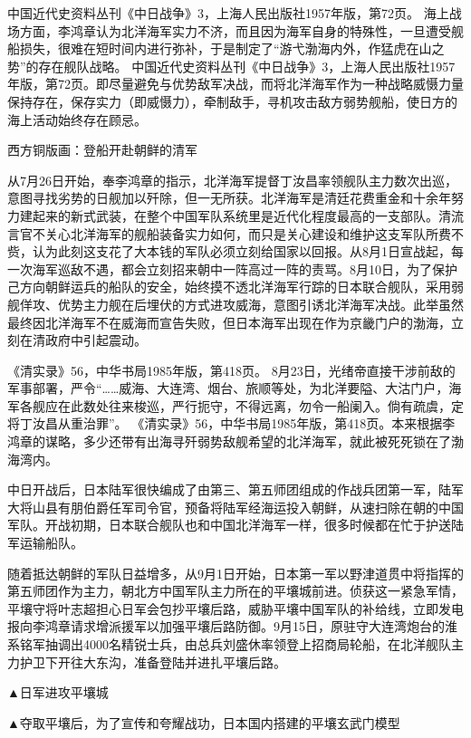 \documentclass[12pt,UTF8]{ctexbook}
\begin{document}
中国近代史资料丛刊《中日战争》3，上海人民出版社1957年版，第72页。
海上战场方面，李鸿章认为北洋海军实力不济，而且因为海军自身的特殊性，一旦遭受舰船损失，很难在短时间内进行弥补，于是制定了“游弋渤海内外，作猛虎在山之势”的存在舰队战略。 中国近代史资料丛刊《中日战争》3，上海人民出版社1957年版，第72页。即尽量避免与优势敌军决战，而将北洋海军作为一种战略威慑力量保持存在，保存实力（即威慑力），牵制敌手，寻机攻击敌方弱势舰船，使日方的海上活动始终存在顾忌。


西方铜版画：登船开赴朝鲜的清军

从7月26日开始，奉李鸿章的指示，北洋海军提督丁汝昌率领舰队主力数次出巡，意图寻找劣势的日舰加以歼除，但一无所获。北洋海军是清廷花费重金和十余年努力建起来的新式武装，在整个中国军队系统里是近代化程度最高的一支部队。清流言官不关心北洋海军的舰船装备实力如何，而只是关心建设和维护这支军队所费不赀，认为此刻这支花了大本钱的军队必须立刻给国家以回报。从8月1日宣战起，每一次海军巡敌不遇，都会立刻招来朝中一阵高过一阵的责骂。8月10日，为了保护己方向朝鲜运兵的船队的安全，始终摸不透北洋海军行踪的日本联合舰队，采用弱舰佯攻、优势主力舰在后埋伏的方式进攻威海，意图引诱北洋海军决战。此举虽然最终因北洋海军不在威海而宣告失败，但日本海军出现在作为京畿门户的渤海，立刻在清政府中引起震动。

《清实录》56，中华书局1985年版，第418页。
8月23日，光绪帝直接干涉前敌的军事部署，严令“……威海、大连湾、烟台、旅顺等处，为北洋要隘、大沽门户，海军各舰应在此数处往来梭巡，严行扼守，不得远离，勿令一船阑入。倘有疏虞，定将丁汝昌从重治罪”。 《清实录》56，中华书局1985年版，第418页。本来根据李鸿章的谋略，多少还带有出海寻歼弱势敌舰希望的北洋海军，就此被死死锁在了渤海湾内。

中日开战后，日本陆军很快编成了由第三、第五师团组成的作战兵团第一军，陆军大将山县有朋伯爵任军司令官，预备将陆军经海运投入朝鲜，从速扫除在朝的中国军队。开战初期，日本联合舰队也和中国北洋海军一样，很多时候都在忙于护送陆军运输船队。

随着抵达朝鲜的军队日益增多，从9月1日开始，日本第一军以野津道贯中将指挥的第五师团作为主力，朝北方中国军队主力所在的平壤城前进。侦获这一紧急军情，平壤守将叶志超担心日军会包抄平壤后路，威胁平壤中国军队的补给线，立即发电报向李鸿章请求增派援军以加强平壤后路防御。9月15日，原驻守大连湾炮台的淮系铭军抽调出4000名精锐士兵，由总兵刘盛休率领登上招商局轮船，在北洋舰队主力护卫下开往大东沟，准备登陆并进扎平壤后路。


▲日军进攻平壤城


▲夺取平壤后，为了宣传和夸耀战功，日本国内搭建的平壤玄武门模型
\end{document}
